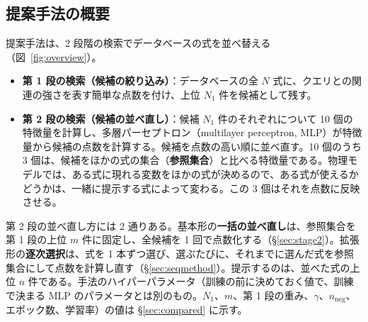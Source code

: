 \documentclass[11pt,a4paper]{ltjsarticle}
\begin{document}
\subsection{提案手法の概要}\label{sec:overview}
提案手法は、2 段階の検索でデータベースの式を並べ替える（図~\ref{fig:overview}）。
\begin{itemize}[leftmargin=1.5em]
  \item \textbf{第 1 段の検索（候補の絞り込み）}：データベースの全 $N$ 式に、クエリとの関連の強さを表す簡単な点数を付け、上位 $N_1$ 件を候補として残す。
  \item \textbf{第 2 段の検索（候補の並べ直し）}：候補 $N_1$ 件のそれぞれについて 10 個の特徴量を計算し、多層パーセプトロン（multilayer perceptron, MLP）が特徴量から候補の点数を計算する。候補を点数の高い順に並べ直す。10 個のうち 3 個は、候補をほかの式の集合（\textbf{参照集合}）と比べる特徴量である。物理モデルでは、ある式に現れる変数をほかの式が決めるので、ある式が使えるかどうかは、一緒に提示する式によって変わる。この 3 個はそれを点数に反映させる。
\end{itemize}
第 2 段の並べ直し方には 2 通りある。基本形の\textbf{一括の並べ直し}は、参照集合を第 1 段の上位 $m$ 件に固定し、全候補を 1 回で点数化する（\S\ref{sec:stage2}）。拡張形の\textbf{逐次選択}は、式を 1 本ずつ選び、選ぶたびに、それまでに選んだ式を参照集合にして点数を計算し直す（\S\ref{sec:seqmethod}）。提示するのは、並べた式の上位 $n$ 件である。手法のハイパーパラメータ（訓練の前に決めておく値で、訓練で決まる MLP のパラメータとは別のもの。$N_1$、$m$、第 1 段の重み、$\gamma$、$n_{\mathrm{neg}}$、エポック数、学習率）の値は \S\ref{sec:compared} に示す。
\end{document}

